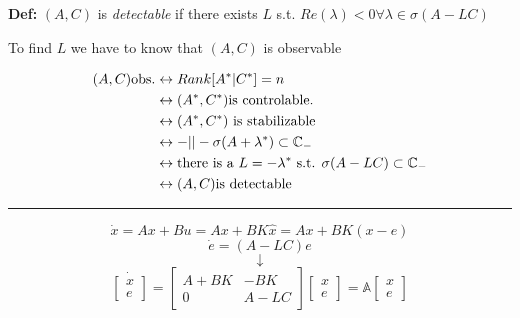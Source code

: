 \documentclass[a4paper]{article}
\begin{document}
\begin{framed}
\textbf{Def:} $ (A,C) $ is  \textit{detectable} if there exists $ L $ s.t.  $ Re(\lambda) < 0  \forall \lambda \in \sigma(A-LC) $  
\end{framed} 


To find $ L $ we have to know that  $ (A,C) $ is observable

\begin{align}
	(A,C) \text{obs.} &\leftrightarrow Rank[A^{*}|C^{*}] = n \\
					  &\leftrightarrow (A^{*},C^{*}) \text{is controlable.} \\
					  &\leftrightarrow (A^{*},C^{*}) \text{ is stabilizable }\\
					  &\leftrightarrow -||- \sigma(A + \lambda^{*}) \subset \mathbb{C}_{-} \\
					  &\leftrightarrow \text{there is a $ L = -\lambda^{*}  $ s.t. }\sigma(A - L C) \subset \mathbb{C}_{-} \\
					  &\leftrightarrow (A,C) \text{is detectable}
\end{align}

\vspace{5pt}
\hrule
\vspace{5pt}

\begin{equation}\label{eq2}
\dot{x} = Ax + Bu = Ax + BK \hat{x} = Ax + B K(x-e)
\end{equation}
\begin{equation}
\dot{e} = (A - L C) e
\end{equation}
\[
\downarrow
\] 
\begin{equation}\label{eq3}
\dot{\begin{bmatrix}
x \\
e
\end{bmatrix} } = \begin{bmatrix}
A+BK & -BK \\
0 & A-LC
\end{bmatrix} \begin{bmatrix}
x \\
e
\end{bmatrix} = \mathbb{A}\begin{bmatrix}
x \\
e
\end{bmatrix} 
\end{equation}
\end{document}
